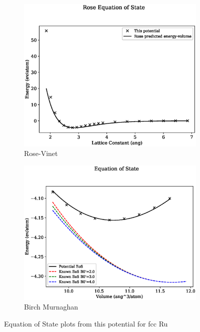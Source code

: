 \begin{figure}[htb]
\begin{subfigure}{.44\textwidth}
  \centering
  \includegraphics[width=.94\linewidth]{chapters/potentials_fe_pd_ru/feru_potential/eos/rose_plot_bp_0.eps}  
  \caption{Rose-Vinet}
  \label{fig:feru-febcc-rose}
\end{subfigure}
\begin{subfigure}{.44\textwidth}
  \centering
  \includegraphics[width=.94\linewidth]{chapters/potentials_fe_pd_ru/feru_potential/eos/equation_of_state_bp_0.eps}  
  \caption{Birch Murnaghan}
  \label{fig:feru-febcc-bmeos}
\end{subfigure}
\label{fig:fepd-febcc-equation-of-state}
\caption{Equation of State plots from this potential for \acrshort{fcc} Ru}
\end{figure}


